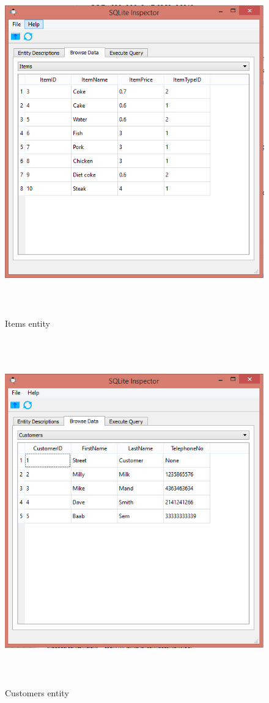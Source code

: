\begin{figure}[H]
    \includegraphics[height = 15cm]{./Maintenance/images/items}
    \caption{Items entity} \label{fig:items}
\end{figure}

\begin{figure}[H]
    \includegraphics[height = 15cm]{./Maintenance/images/customers}
    \caption{Customers entity} \label{fig:customers}
\end{figure}


